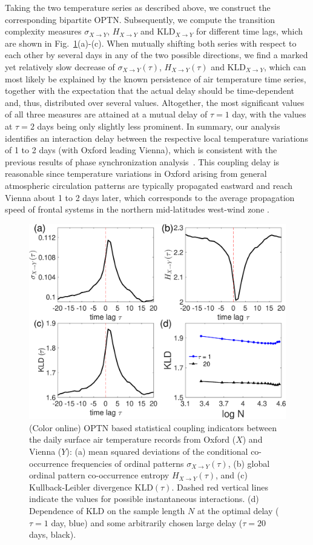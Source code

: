 \documentclass[12pt,aip,cha,reprint,nofootinbib]{revtex4-1}
\begin{document}
Taking the two temperature series as described above, we construct the corresponding bipartite OPTN. Subsequently, we compute the transition complexity measures $\sigma_{X\to Y}$, $H_{X\to Y}$ and $\text{KLD}_{X\to Y}$ for different time lags, which are shown in Fig.~\ref{fig:stdHeqTemp}(a)-(c). When mutually shifting both series with respect to each other by several days in any of the two possible directions, we find a marked yet relatively slow decrease of $\sigma_{X\to Y} (\tau)$, $H_{X\to Y} (\tau)$ and $\text{KLD}_{X\to Y}$, which can most likely be explained by the known persistence of air temperature time series, together with the expectation that the actual delay should be time-dependent and, thus, distributed over several values. Altogether, the most significant values of all three measures are attained at a mutual delay of $\tau=1$ day, with the values at $\tau=2$ days being only slightly less prominent. In summary, our analysis identifies an interaction delay between the respective local temperature variations of 1 to 2 days (with Oxford leading Vienna), which is consistent with the previous results of phase synchronization analysis~\cite{Rybski2003}. This coupling delay is reasonable since temperature variations in Oxford arising from general atmospheric circulation patterns are typically propagated eastward and reach Vienna about 1 to 2 days later, which corresponds to the average propagation speed of frontal systems in the northern mid-latitudes west-wind zone {\color{red}\cite{Barnston1987}}. 

\begin{figure}
	\centering
	\includegraphics[width=\columnwidth]{E_temperature.eps}
\caption{(Color online) OPTN based statistical coupling indicators between the daily surface air temperature records from Oxford ($X$) and Vienna ($Y$): (a) mean squared deviations of the conditional co-occurrence frequencies of ordinal patterns $\sigma_{X\to Y} (\tau)$, (b) global ordinal pattern co-occurrence entropy $H_{X\to Y}(\tau)$, and (c) Kullback-Leibler divergence $\text{KLD}(\tau)$. Dashed red vertical lines indicate the values for possible instantaneous interactions. (d) Dependence of KLD on the sample length $N$ at the optimal delay ($\tau=1$ day, blue) and some arbitrarily chosen large delay ($\tau=20$ days, black). 
\label{fig:stdHeqTemp}}
\end{figure}
\end{document}
